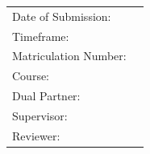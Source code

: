 \begin{titlepage}
	\begin{flushleft}
		{\fontsize{12pt}{14pt}\selectfont
			\begin{tabular}{ll}
				Date of Submission:		& \quad \abgabedatum \\
				Timeframe:		& \quad \bearbeitungszeitraum   \\ 
				Matriculation Number: 	& \quad \matrikelnr \\ 
				Course: 				& \quad \kurs \\
				Dual Partner:	 		& \quad \firma \\ %
				Supervisor:             & \quad \betreuerfirma \\ %
				Reviewer:               & \quad \gutachterdhbw \\ [2ex] %
			\end{tabular}
		}
	\end{flushleft}
\end{titlepage}

%

\hypersetup{pageanchor=true}
